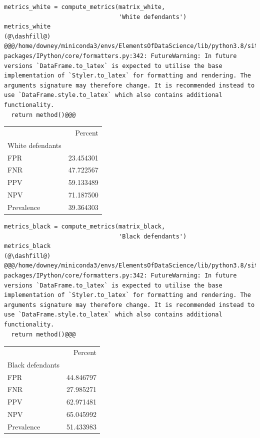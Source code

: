 \begin{lstlisting}[]
metrics_white = compute_metrics(matrix_white, 
                                'White defendants')
metrics_white
(@\dashfill@)
@@@/home/downey/miniconda3/envs/ElementsOfDataScience/lib/python3.8/site-packages/IPython/core/formatters.py:342: FutureWarning: In future versions `DataFrame.to_latex` is expected to utilise the base implementation of `Styler.to_latex` for formatting and rendering. The arguments signature may therefore change. It is recommended instead to use `DataFrame.style.to_latex` which also contains additional functionality.
  return method()@@@
\end{lstlisting}

\begin{tabular}{lr}
\midrule
{} &    Percent \\
White defendants &            \\
\midrule
FPR              &  23.454301 \\
FNR              &  47.722567 \\
PPV              &  59.133489 \\
NPV              &  71.187500 \\
Prevalence       &  39.364303 \\
\midrule
\end{tabular}

\begin{lstlisting}[]
metrics_black = compute_metrics(matrix_black, 
                                'Black defendants')
metrics_black
(@\dashfill@)
@@@/home/downey/miniconda3/envs/ElementsOfDataScience/lib/python3.8/site-packages/IPython/core/formatters.py:342: FutureWarning: In future versions `DataFrame.to_latex` is expected to utilise the base implementation of `Styler.to_latex` for formatting and rendering. The arguments signature may therefore change. It is recommended instead to use `DataFrame.style.to_latex` which also contains additional functionality.
  return method()@@@
\end{lstlisting}

\begin{tabular}{lr}
\midrule
{} &    Percent \\
Black defendants &            \\
\midrule
FPR              &  44.846797 \\
FNR              &  27.985271 \\
PPV              &  62.971481 \\
NPV              &  65.045992 \\
Prevalence       &  51.433983 \\
\midrule
\end{tabular}

